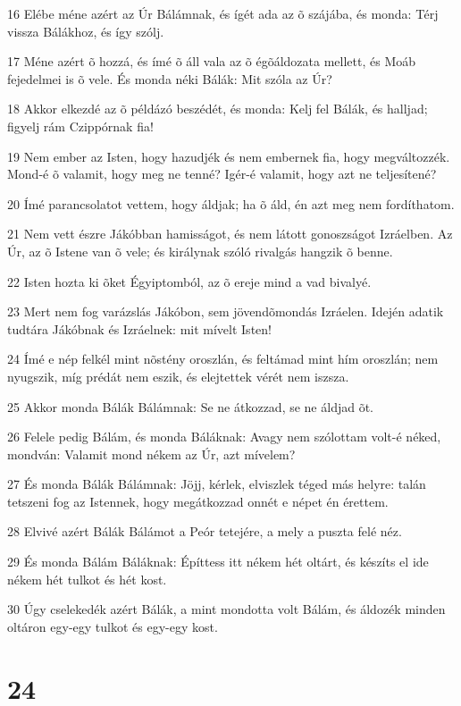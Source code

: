 \par 16 Elébe méne azért az Úr Bálámnak, és ígét ada az õ szájába, és monda: Térj vissza Bálákhoz, és így szólj.
\par 17 Méne azért õ hozzá, és ímé õ áll vala az õ égõáldozata mellett, és Moáb fejedelmei is õ vele. És monda néki Bálák: Mit szóla az Úr?
\par 18 Akkor elkezdé az õ példázó beszédét, és monda: Kelj fel Bálák, és halljad; figyelj rám Czippórnak fia!
\par 19 Nem ember az Isten, hogy hazudjék és nem embernek fia, hogy megváltozzék. Mond-é õ valamit, hogy meg ne tenné? Igér-é valamit, hogy azt ne teljesítené?
\par 20 Ímé parancsolatot vettem, hogy áldjak; ha õ áld, én azt meg nem fordíthatom.
\par 21 Nem vett észre Jákóbban hamisságot, és nem látott gonoszságot Izráelben. Az Úr, az õ Istene van õ vele; és királynak szóló rivalgás hangzik õ benne.
\par 22 Isten hozta ki õket Égyiptomból, az õ ereje mind a  vad bivalyé.
\par 23 Mert nem fog varázslás Jákóbon, sem jövendõmondás Izráelen. Idején adatik tudtára Jákóbnak és Izráelnek: mit mívelt Isten!
\par 24 Ímé e nép felkél mint nõstény oroszlán, és feltámad mint hím oroszlán; nem nyugszik, míg prédát nem eszik, és elejtettek vérét nem iszsza.
\par 25 Akkor monda Bálák Bálámnak: Se ne átkozzad, se ne áldjad õt.
\par 26 Felele pedig Bálám, és monda Báláknak: Avagy nem szólottam volt-é néked, mondván: Valamit mond nékem az Úr, azt mívelem?
\par 27 És monda Bálák Bálámnak: Jöjj, kérlek, elviszlek téged más helyre: talán tetszeni fog az Istennek, hogy megátkozzad onnét e népet én érettem.
\par 28 Elvivé azért Bálák Bálámot a Peór tetejére, a mely a puszta felé néz.
\par 29 És monda Bálám Báláknak: Építtess itt nékem hét oltárt, és készíts el ide nékem hét tulkot és hét kost.
\par 30 Úgy cselekedék azért Bálák, a mint mondotta volt Bálám, és áldozék minden oltáron egy-egy tulkot és egy-egy kost.

\chapter{24}


